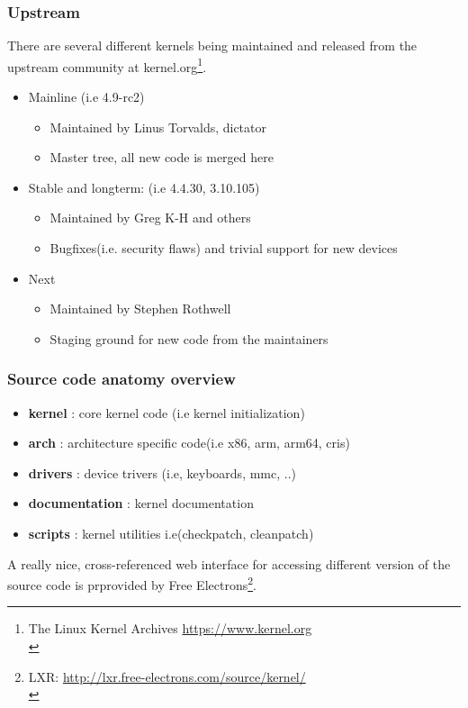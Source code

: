 \documentclass{beamer}
\begin{document}
\begin{frame}
\frametitle{Upstream}

There are several different kernels being maintained and released from the upstream community at kernel.org\footnote{The Linux Kernel Archives \url{https://www.kernel.org}\\}.

\begin{itemize}
	\item Mainline (i.e 4.9-rc2)
	\begin{itemize}
		\item Maintained by Linus Torvalds, dictator
		\item Master tree, all new code is merged here
	\end{itemize}
	\item Stable and longterm: (i.e 4.4.30, 3.10.105)
	\begin{itemize}
		\item Maintained by Greg K-H and others
		\item Bugfixes(i.e. security flaws) and trivial support for new devices
	\end{itemize}
	\item Next 
	\begin{itemize}	
		\item Maintained by Stephen Rothwell
		\item Staging ground for new code from the maintainers
	\end{itemize}
\end{itemize}
\end{frame}

\begin{frame}
\frametitle{Source code anatomy overview}
\begin{itemize}
	\item \textbf{kernel} : core kernel code (i.e kernel initialization) \\
	\item \textbf{arch} : architecture specific code(i.e x86, arm, arm64, cris) \\
	\item \textbf{drivers} : device trivers (i.e, keyboards, mmc, ..) \\
	\item \textbf{documentation} : kernel documentation \\
	\item \textbf{scripts} : kernel utilities i.e(checkpatch, cleanpatch) \\
\end{itemize}

A really nice, cross-referenced web interface for accessing different version of the source code is prprovided by Free Electrons\footnote{LXR: \url{http://lxr.free-electrons.com/source/kernel/}\\}.
\end{frame}
\end{document}
